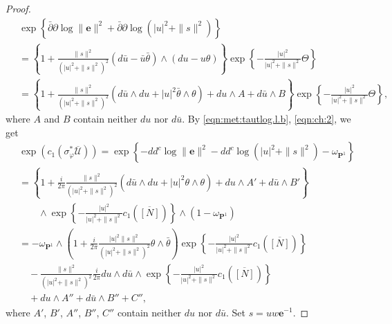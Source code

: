 \documentclass[amscd, leqno]{amsart}
\theoremstyle{plain}
\theoremstyle{definition}
\theoremstyle{remark}
\newenvironment{pf}{\begin{proof}}{\end{proof}}
\begin{document}
\begin{pf}
\begin{equation}
\begin{aligned}
\,&
\exp\left\{ \bar{\partial}\partial \log \| {\mathbf e} \|^{2} + \bar{\partial}\partial \log ( |u|^{2} + \| s \|^{2} ) \right\}
\\
&=
\left\{ 1 + \frac{\| s \|^{2}}{ ( |u|^{2} + \|s\|^{2} )^{2} } (d\bar{u} - \bar{u} \bar{\theta} ) {\scriptstyle \wedge} (du - u \theta ) \right\}
\exp\left\{ - \frac{|u|^{2}}{ |u|^{2} + \| s \|^{2}} \Theta \right\}
\\
&=
\left\{ 1 + \frac{\| s \|^{2}}{ ( |u|^{2} + \|s\|^{2} )^{2} } (d\bar{u} {\scriptstyle \wedge} du + |u|^{2} \bar{\theta} {\scriptstyle \wedge} \theta ) 
+ du {\scriptstyle \wedge} A + d\bar{u} {\scriptstyle \wedge} B \right\}
\exp\left\{ - \frac{|u|^{2}}{ |u|^{2} + \| s \|^{2}} \Theta \right\},
\end{aligned}
\end{equation}
where $A$ and $B$ contain neither $du$ nor $d\bar{u}$. By \eqref{eqn:met:tautlog.l.b}, \eqref{eqn:ch:2}, we get
\begin{equation}
\label{eqn:ch:3}
\begin{aligned}
\,&
\exp( c_{1}( \sigma_{\varphi}^{*}\overline{\mathscr U} ))
=
\exp\left\{ -dd^{c}\log\| {\mathbf e} \|^{2} -dd^{c}\log ( |u|^{2} + \| s \|^{2} ) - \omega_{{\mathbf P}^{1}} \right\}
\\
&=
\left\{ 
1 + \frac{i}{2\pi}\frac{\| s \|^{2}}{ ( |u|^{2} + \|s\|^{2} )^{2} } (d\bar{u} {\scriptstyle \wedge} du + |u|^{2} \theta {\scriptstyle \wedge} \theta ) 
+ du {\scriptstyle \wedge} A' + d\bar{u} {\scriptstyle \wedge} B' \right\}
\\
&\qquad
{\scriptstyle \wedge} \exp\left\{ - \frac{|u|^{2}}{ |u|^{2} + \| s \|^{2}} c_{1}(\overline{[N]}) \right\} {\scriptstyle \wedge} ( 1 - \omega_{{\mathbf P}^{1}} )
\\
&=
-\omega_{{\mathbf P}^{1}} {\scriptstyle \wedge}
\left( 1 + \frac{i}{2\pi} \frac{|u|^{2} \|s\|^{2}}{( |u|^{2} + \| s \|^{2} )^{2}} \theta {\scriptstyle \wedge} \bar{\theta}  \right)
\exp\left\{ - \frac{|u|^{2}}{ |u|^{2} + \| s \|^{2}} c_{1}(\overline{[N]}) \right\}
\\
&\quad
-
\frac{\| s \|^{2}}{ ( |u|^{2} + \|s\|^{2} )^{2} } \frac{i}{2\pi} du {\scriptstyle \wedge} d\bar{u} 
{\scriptstyle \wedge} \exp\left\{ - \frac{|u|^{2}}{ |u|^{2} + \| s \|^{2}} c_{1}(\overline{[N]}) \right\}
\\
&\quad
+ du {\scriptstyle \wedge} A'' + d\bar{u} {\scriptstyle \wedge} B'' +C'',
\end{aligned}
\end{equation}
where $A'$, $B'$, $A''$, $B''$, $C''$ contain neither $du$ nor $d\bar{u}$. Set $s = uw {\mathbf e}^{-1}$. 

\end{pf}
\end{document}
